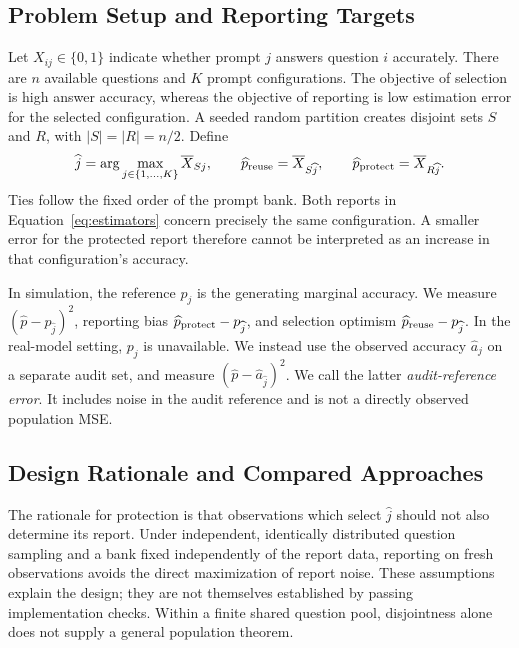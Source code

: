 \documentclass{article}
\begin{document}
\subsection{Problem Setup and Reporting Targets}
Let $X_{ij}\in\{0,1\}$ indicate whether prompt $j$ answers question $i$ accurately. There are $n$ available questions and $K$ prompt configurations. The objective of selection is high answer accuracy, whereas the objective of reporting is low estimation error for the selected configuration. A seeded random partition creates disjoint sets $S$ and $R$, with $|S|=|R|=n/2$. Define
\begin{equation}
 \widehat j=\arg\max_{j\in\{1,\ldots,K\}}\overline X_{Sj},\qquad
 \widehat p_{\rm reuse}=\overline X_{S\widehat j},\qquad
 \widehat p_{\rm protect}=\overline X_{R\widehat j}.
 \label{eq:estimators}
\end{equation}
Ties follow the fixed order of the prompt bank. Both reports in Equation~\ref{eq:estimators} concern precisely the same configuration. A smaller error for the protected report therefore cannot be interpreted as an increase in that configuration's accuracy.

In simulation, the reference $p_j$ is the generating marginal accuracy. We measure $(\widehat p-p_{\widehat j})^2$, reporting bias $\widehat p_{\rm protect}-p_{\widehat j}$, and selection optimism $\widehat p_{\rm reuse}-p_{\widehat j}$. In the real-model setting, $p_j$ is unavailable. We instead use the observed accuracy $\widehat a_j$ on a separate audit set, and measure $(\widehat p-\widehat a_{\widehat j})^2$. We call the latter \emph{audit-reference error}. It includes noise in the audit reference and is not a directly observed population MSE.

\subsection{Design Rationale and Compared Approaches}
The rationale for protection is that observations which select $\widehat j$ should not also determine its report. Under independent, identically distributed question sampling and a bank fixed independently of the report data, reporting on fresh observations avoids the direct maximization of report noise. These assumptions explain the design; they are not themselves established by passing implementation checks. Within a finite shared question pool, disjointness alone does not supply a general population theorem.
\end{document}
